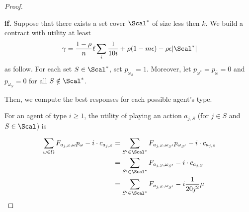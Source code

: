 \begin{proof}
\begin{itemize}
%		
%		
%		
	\end{itemize}
	
	
	
	
	
	\textbf{if.}
	Suppose that there exists a set cover $\Scal^*$ of size less then $k$.
	We build a contract with utility at least 
	\[\gamma=	 \frac{1-\rho}{n} \ell \sum_{i} \frac{1}{10i} + \rho (1-m\epsilon) - \rho \epsilon |\Scal^*|  \]
	as follow.
	For each set $S\in \Scal^*$, set
	$p_{\omega_S}=1$.
	Moreover, let $p_{\omega^*}=p_{\bar \omega}=0$ and $p_{\omega_S}=0$ for all $S\notin \Scal^*$.
	
	Then, we compute the best responses for each possible agent's type.
	
	For an agent of type $i\ge 1$, the utility of playing an action $a_{j, S}$ (for $j\in S$ and $S\in\Scal$) is
	
	\begin{align}
		\sum_{\omega \in \Omega} F_{ a_{j, S}, \omega } p_\omega - i \cdot c_{a_{j, S}} &= \sum_{S'\in\Scal^*} F_{ a_{j, S}, {\omega_{S'}} } p_{\omega_{S'}} - i \cdot c_{a_{j, S}}\\
		&=\sum_{S'\in\Scal^*} F_{ a_{j, S}, {\omega_{S'}} }- i \cdot c_{a_{j, S}}\\
		&=\sum_{S'\in\Scal^*} F_{ a_{j, S}, {\omega_{S'}} }-i \frac{1}{20 j^2}\mu
	\end{align}
	

\end{proof}
